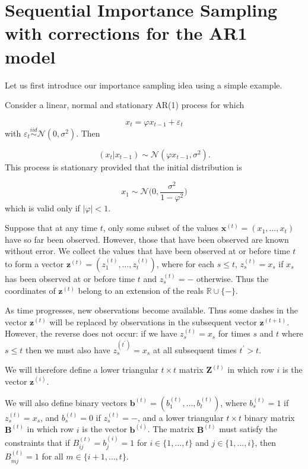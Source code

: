 \documentclass[11pt,a4paper]{article}
\newcommand{\eps}{\varepsilon}
\renewcommand{\vec}[1]{\mathbf{#1}}
\begin{document}
\section{Sequential Importance Sampling with corrections for the AR1 model}

Let us first introduce our importance sampling idea using a simple example.

Consider a linear, normal and stationary AR(1) process for which

\[
x_{t} = \varphi x_{t-1} + \eps_{t}
\]
with $\eps_{t} \stackrel{iid}{\sim} \mathcal{N}(0, \sigma^{2})$.
Then

\[
(x_{t} | x_{t-1}) \sim \mathcal{N} (\varphi x_{t-1}, \sigma^{2}).
\]
This process is stationary provided that the initial distribution is

\[
x_{1} \sim \mathcal{N} \Bigg (0, \frac{\sigma^2}{1- \varphi^2} \Bigg )
\]
which is valid only if $|\varphi| < 1$.

Suppose that at any time $t$, only some subset of the values $\vec {x}^{(t)} = (x_1, \dots, x_{t})$ have so far been observed. However, those that have been observed are known without error. We collect the values that have been observed at or before time $t$ to form a vector $\vec{z}^{(t)} = (z_1^{(t)}, \dots, z_{t}^{(t)})$, where for each $s \leq t$, $z_s^{(t)} = x_s$ if $x_s$ has been observed at or before time $t$ and $z_s^{(t)} = -$ otherwise. Thus the coordinates of $\vec{z}^{(t)}$ belong to an extension of the reals $\mathbb{R} \cup \{ - \}$.

As time progresses, new observations become available. Thus some dashes in the vector $\vec{z}^{(t)}$ will be replaced by observations in the subsequent vector $\vec{z}^{(t+1)}$. However, the reverse does not occur: if we have $z_s^{(t)} = x_s$ for times $s$ and $t$ where $s \leq t$ then we must also have $z_s^{(t^{\prime})} = x_s$ at all subsequent times $t^{\prime} > t$.

We will therefore define a lower triangular $t \times t$ matrix $\vec{Z}^{(t)}$ in which row $i$ is the vector $\vec{z}^{(i)}$.

We will also define binary vectors $\vec{b}^{(t)} = (b_1^{(t)}, \dots, b_{t}^{(t)})$, where $b_s^{(t)} = 1$ if $z_s^{(t)} = x_s$, and $b_s^{(t)} = 0$ if $z_s^{(t)} = -$, and a lower triangular $t \times t$ binary matrix $\vec{B}^{(t)}$ in which row $i$ is the vector $\vec{b}^{(i)}$.
The matrix $\vec{B}^{(t)}$ must satisfy the constraints that if $B_{ij}^{(t)} = b_j^{(i)} = 1$ for $i \in \{ 1, \ldots, t \}$ and $j \in \{ 1, \ldots, i \}$, then $B_{mj}^{(t)} = 1$ for all $m \in \{ i+1, \ldots, t \}$.
\end{document}
